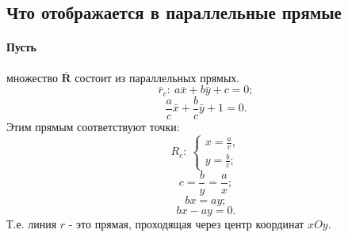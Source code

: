 \subsection{Что отображается в параллельные прямые}
\paragraph{Пусть} множество $\bar{\mathbf{R}}$ состоит из параллельных прямых.
$$\bar{r}_c: \: a\bar{x} + b\bar{y} + c = 0;$$
$$\frac{a}{c}\bar{x} + \frac{b}{c}\bar{y} + 1 = 0.$$
Этим прямым соответствуют точки:
$$R_c: \: \left\{ \begin{gathered}
x = \frac{a}{c},\\
y = \frac{b}{c};
\end{gathered} \right.
$$
$$c = \frac{b}{y} = \frac{a}{x};$$
$$bx = ay;$$
$$bx - ay = 0.$$
Т.е. линия $r$ - это прямая, проходящая через центр координат $xOy$.